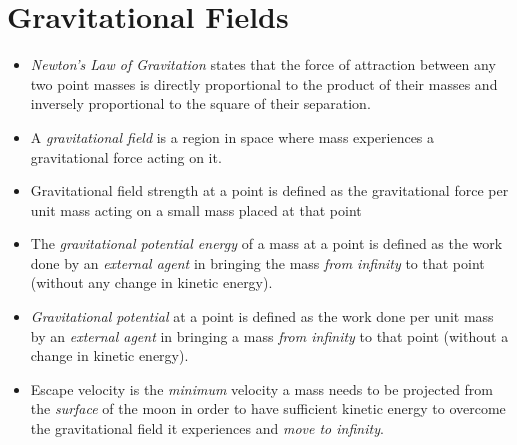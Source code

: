 \documentclass[oneside]{book}
\begin{document}
\chapter{Gravitational Fields}
\begin{itemize}
    \item \textit{Newton's Law of Gravitation} states that the force of attraction between any two point masses is directly proportional to the product of their masses and inversely proportional to the square of their separation.
    \item A \textit{gravitational field} is a region in space where mass experiences a gravitational force acting on it.
    \item Gravitational field strength at a point is defined as the gravitational force per unit mass acting on a small mass placed at that point
    \item The \textit{gravitational potential energy} of a mass at a point is defined as the work done by an \emph{external agent} in bringing the mass \emph{from infinity} to that point (without any change in kinetic energy).
    \item \textit{Gravitational potential} at a point is defined as the work done per unit mass by an \emph{external agent} in bringing a mass \emph{from infinity} to that point (without a change in kinetic energy).
    \item Escape velocity is the \emph{minimum} velocity a mass needs to be projected from the \emph{surface} of the moon in order to have sufficient kinetic energy to overcome the gravitational field it experiences and \emph{move to infinity}.
\end{itemize}
\end{document}
